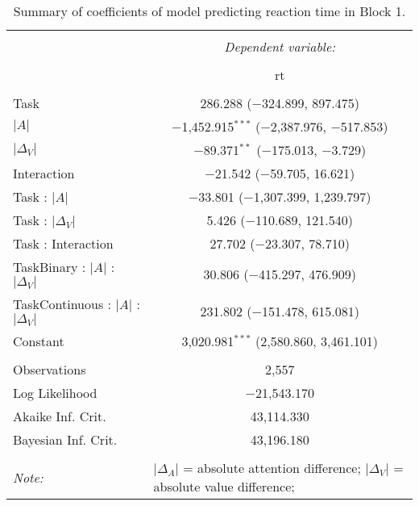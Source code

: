 
\begin{table}[t] \centering 
  \caption{Summary of coefficients of model predicting reaction time in Block 1.} 
  \label{table:rtModelBlock1} 
\begin{tabular}{@{\extracolsep{5pt}}lc} 
\\[-1.8ex]\hline 
\hline \\[-1.8ex] 
 & \multicolumn{1}{c}{\textit{Dependent variable:}} \\ 
\cline{2-2} 
\\[-1.8ex] & rt \\ 
\hline \\[-1.8ex] 
 Task & 286.288 ($-$324.899, 897.475) \\ 
  $\vert A \vert$ & $-$1,452.915$^{***}$ ($-$2,387.976, $-$517.853) \\ 
  $\vert\Delta_V\vert$ & $-$89.371$^{**}$ ($-$175.013, $-$3.729) \\ 
  Interaction & $-$21.542 ($-$59.705, 16.621) \\ 
  Task : $\vert A \vert$ & $-$33.801 ($-$1,307.399, 1,239.797) \\ 
  Task : $\vert\Delta_V\vert$ & 5.426 ($-$110.689, 121.540) \\ 
  Task : Interaction & 27.702 ($-$23.307, 78.710) \\ 
  TaskBinary : $\vert A \vert$ :  $\vert\Delta_V\vert$ & 30.806 ($-$415.297, 476.909) \\ 
  TaskContinuous : $\vert A \vert$ :  $\vert\Delta_V\vert$ & 231.802 ($-$151.478, 615.081) \\ 
  Constant & 3,020.981$^{***}$ (2,580.860, 3,461.101) \\ 
 \hline \\[-1.8ex] 
Observations & 2,557 \\ 
Log Likelihood & $-$21,543.170 \\ 
Akaike Inf. Crit. & 43,114.330 \\ 
Bayesian Inf. Crit. & 43,196.180 \\ 
\hline 
\hline \\[-1.8ex] 
\textit{Note:}  & \multicolumn{1}{l}{\footnotesize $\vert\Delta_A\vert$ = absolute attention difference; $\vert\Delta_V\vert$ = absolute value difference; } \\ 
\end{tabular} 
\end{table} 
